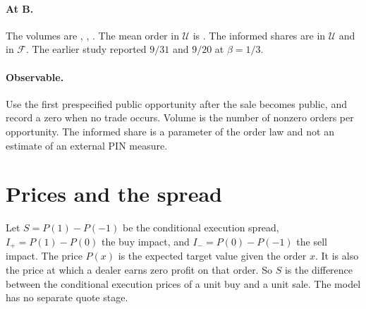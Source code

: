 \documentclass[12pt]{article}
\theoremstyle{definition}
\begin{document}
\paragraph{At B.}
The volumes are , , .
The mean order in $\mathcal U$ is .
The informed shares are  in $\mathcal U$ and  in $\mathcal F$.
The earlier study reported $9/31$ and $9/20$ at $\beta=1/3$.

\paragraph{Observable.}
Use the first prespecified public opportunity after the sale becomes public, and record a zero when no trade occurs.
Volume is the number of nonzero orders per opportunity.
The informed share is a parameter of the order law and not an estimate of an external PIN measure.

\section{Prices and the spread}\label{sec:spread}

Let $S=P(1)-P(-1)$ be the conditional execution spread, $I_+=P(1)-P(0)$ the buy impact, and $I_-=P(0)-P(-1)$ the sell impact.
The price $P(x)$ is the expected target value given the order $x$.
It is also the price at which a dealer earns zero profit on that order.
So $S$ is the difference between the conditional execution prices of a unit buy and a unit sale.
The model has no separate quote stage.
\end{document}
